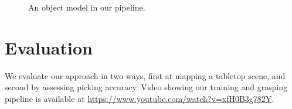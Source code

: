 \documentclass[graybox]{svmult}
\begin{document}
\begin{figure}


\caption{An object model in our pipeline.\label{fig:ruler_model}}
\end{figure}


\section{Evaluation}

We evaluate our approach in two ways, first at mapping a tabletop
scene, and second by assessing picking accuracy.  Video showing our
training and grasping pipeline is available at
\url{https://www.youtube.com/watch?v=xfH0B3g782Y}.
\end{document}

